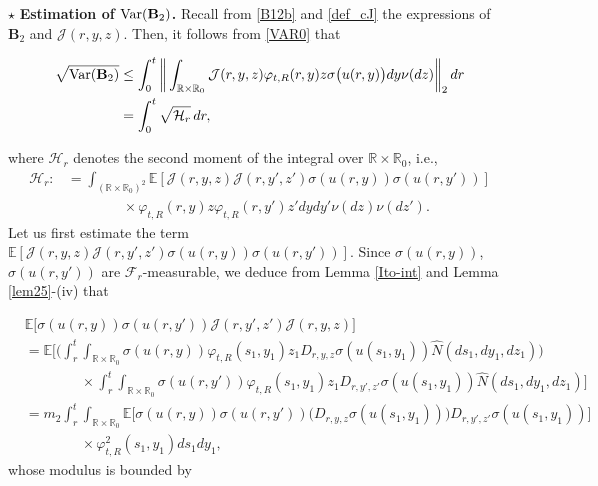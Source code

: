 \documentclass[letterpaper, 11pt,  reqno]{amsart}
\newcommand{\wh}{\widehat}
\newcommand{\noi}{\noindent}
\newcommand{\R}{\mathbb{R}}
\newcommand{\E}{\mathbb{E}}
\newcommand{\F}{\mathcal{F}}
\newcommand{\s}{\sigma}
\newcommand{\Var}{\textup{Var}}
\numberwithin{equation}{section}
\numberwithin{theorem}{section}
\begin{document}
 
 \smallskip

 $\star$ {\bf Estimation of  $  \Var(  \mathbf{B}_2) $.} 
 Recall from \eqref{B12b} and \eqref{def_cJ} the expressions of $\mathbf{B}_2$
 and $\mathcal{J}(r, y,z)$.
 Then, it follows from \eqref{VAR0}  that   
 
 
 
 
 \noi
 \begin{align}\label{VARB21}
  \begin{aligned}
 \sqrt{ \Var(  \mathbf{B}_2) }
 & \leq \int_0^t 
\bigg\|  \int_{\R\times\R_0}
\mathcal{J}(r, y, z)   \varphi_{t, R}(r,y) z  \s\big( u(r, y) \big) 
dy \nu(dz)  \bigg\|_2  \,  dr \\
&=  \int_0^t 
 \sqrt{ \mathcal{H}_r } \, dr,
 \end{aligned} 
 \end{align}
 
 \noi
where $ \mathcal{H}_r$ denotes the second moment of the integral over $\R\times\R_0$,
i.e.,  
 \begin{align*}
 \mathcal{H}_r:&=
  \int_{(\R\times\R_0)^2}
\E[ \mathcal{J}(r, y, z)\mathcal{J}(r, y', z')   \s( u(r, y) )  \s( u(r, y') )   ] \\
&\qquad\qquad\times 
 \varphi_{t, R}(r,y) z     \varphi_{t, R}(r,y') z'     
dydy' \nu(dz) \nu(dz').
\end{align*}
Let us first estimate the term 
$\E[ \mathcal{J}(r, y, z)\mathcal{J}(r, y', z')   \s( u(r, y) )  \s( u(r, y') )   ]$.
 Since  $  \s(u(r,y))$,   $\s( u(r, y') )$ are $\F_r$-measurable, 
 we deduce from  Lemma \ref{Ito-int} and Lemma \ref{lem25}-(iv) that 
 
 \noi
  \begin{align*}
& \E\big[   \s(u(r,y)) \s( u(r, y') ) \mathcal{J}(r, y',z')\mathcal{J}(r, y,z) \big] \\
& =\E\bigg[  \Big( \int_r^t \int_{\R\times\R_0}  \s(u(r,y)) \varphi_{t, R}(s_1, y_1)  z_1 D_{r, y, z}   \s(u(s_1,y_1)) 
 \wh{N}(ds_1, dy_1, dz_1) \Big) \\
 &\qquad\qquad\times
  \int_r^t \int_{\R\times\R_0}  \s(u(r,y')) \varphi_{t, R}(s_1, y_1)  z_1 D_{r, y', z'}   \s(u(s_1,y_1)) 
 \wh{N}(ds_1, dy_1, dz_1) \bigg] \\
 &=m_2  \int_r^t \int_{\R\times\R_0} \E\Big[  \s(u(r,y))    \s(u(r,y'))      
  \big(  D_{r, y, z}   \s(u(s_1,y_1))  \big)  D_{r, y', z'}   \s(u(s_1,y_1))    \Big] \\
   &\qquad\qquad\times
         \varphi^2_{t, R}(s_1, y_1)   ds_1 dy_1,   
 \end{align*} 
 whose modulus  is bounded by
 
\end{document}
